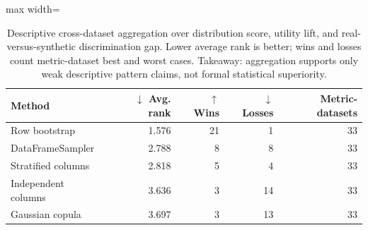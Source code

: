 \begin{table}
\caption{Descriptive cross-dataset aggregation over distribution score, utility lift, and real-versus-synthetic discrimination gap. Lower average rank is better; wins and losses count metric-dataset best and worst cases. Takeaway: aggregation supports only weak descriptive pattern claims, not formal statistical superiority.}
\label{tab:cross-dataset-aggregation}
\begin{adjustbox}{max width=\columnwidth}
\begin{tabular}{lrrrr}
\toprule
Method & $\downarrow$ Avg. rank & $\uparrow$ Wins & $\downarrow$ Losses & Metric-datasets \\
\midrule
Row bootstrap & 1.576 & 21 & 1 & 33 \\
DataFrameSampler & 2.788 & 8 & 8 & 33 \\
Stratified columns & 2.818 & 5 & 4 & 33 \\
Independent columns & 3.636 & 3 & 14 & 33 \\
Gaussian copula & 3.697 & 3 & 13 & 33 \\
\bottomrule
\end{tabular}
\end{adjustbox}
\end{table}
